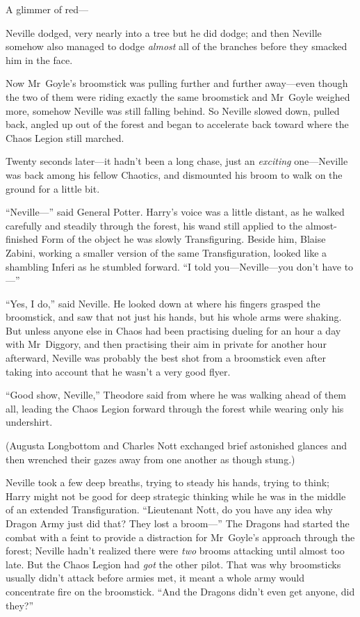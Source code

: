 A glimmer of red—

Neville dodged, very nearly into a tree but he did dodge; and then Neville somehow also managed to dodge \emph{almost} all of the branches before they smacked him in the face.

Now Mr~Goyle’s broomstick was pulling further and further away—even though the two of them were riding exactly the same broomstick and Mr~Goyle weighed more, somehow Neville was still falling behind. So Neville slowed down, pulled back, angled up out of the forest and began to accelerate back toward where the Chaos Legion still marched.

Twenty seconds later—it hadn’t been a long chase, just an \emph{exciting} one—Neville was back among his fellow Chaotics, and dismounted his broom to walk on the ground for a little bit.

“Neville—” said General Potter. Harry’s voice was a little distant, as he walked carefully and steadily through the forest, his wand still applied to the almost-finished Form of the object he was slowly Transfiguring. Beside him, Blaise Zabini, working a smaller version of the same Transfiguration, looked like a shambling Inferi as he stumbled forward. “I told you—Neville—you don’t have to—”

“Yes, I do,” said Neville. He looked down at where his fingers grasped the broomstick, and saw that not just his hands, but his whole arms were shaking. But unless anyone else in Chaos had been practising dueling for an hour a day with Mr~Diggory, and then practising their aim in private for another hour afterward, Neville was probably the best shot from a broomstick even after taking into account that he wasn’t a very good flyer.

“Good show, Neville,” Theodore said from where he was walking ahead of them all, leading the Chaos Legion forward through the forest while wearing only his undershirt.

(Augusta Longbottom and Charles Nott exchanged brief astonished glances and then wrenched their gazes away from one another as though stung.)

Neville took a few deep breaths, trying to steady his hands, trying to think; Harry might not be good for deep strategic thinking while he was in the middle of an extended Transfiguration. “Lieutenant Nott, do you have any idea why Dragon Army just did that? They lost a broom—” The Dragons had started the combat with a feint to provide a distraction for Mr~Goyle’s approach through the forest; Neville hadn’t realized there were \emph{two} brooms attacking until almost too late. But the Chaos Legion had \emph{got} the other pilot. That was why broomsticks usually didn’t attack before armies met, it meant a whole army would concentrate fire on the broomstick. “And the Dragons didn’t even get anyone, did they?”

